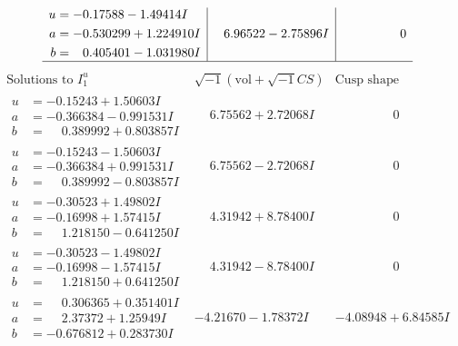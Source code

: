 \documentclass[1p]{elsarticle_modified}
\theoremstyle{definition}
\newcommand{\I}{\sqrt{-1}}
\begin{document}
$$\begin{array}{c|c|c}
\begin{aligned}
u &= -0.17588 - 1.49414 I \\
a &= -0.530299 + 1.224910 I \\
b &= \phantom{-}0.405401 - 1.031980 I\end{aligned}
 & \phantom{-}6.96522 - 2.75896 I & \phantom{-0.000000 } 0\\
 \hline 
 \end{array}$$\newpage$$\begin{array}{c|c|c}  
\text{Solutions to }I^u_{1}& \I (\text{vol} + \sqrt{-1}CS) & \text{Cusp shape}\\
 \hline 
\begin{aligned}
u &= -0.15243 + 1.50603 I \\
a &= -0.366384 - 0.991531 I \\
b &= \phantom{-}0.389992 + 0.803857 I\end{aligned}
 & \phantom{-}6.75562 + 2.72068 I & \phantom{-0.000000 } 0 \\ \hline\begin{aligned}
u &= -0.15243 - 1.50603 I \\
a &= -0.366384 + 0.991531 I \\
b &= \phantom{-}0.389992 - 0.803857 I\end{aligned}
 & \phantom{-}6.75562 - 2.72068 I & \phantom{-0.000000 } 0 \\ \hline\begin{aligned}
u &= -0.30523 + 1.49802 I \\
a &= -0.16998 + 1.57415 I \\
b &= \phantom{-}1.218150 - 0.641250 I\end{aligned}
 & \phantom{-}4.31942 + 8.78400 I & \phantom{-0.000000 } 0 \\ \hline\begin{aligned}
u &= -0.30523 - 1.49802 I \\
a &= -0.16998 - 1.57415 I \\
b &= \phantom{-}1.218150 + 0.641250 I\end{aligned}
 & \phantom{-}4.31942 - 8.78400 I & \phantom{-0.000000 } 0 \\ \hline\begin{aligned}
u &= \phantom{-}0.306365 + 0.351401 I \\
a &= \phantom{-}2.37372 + 1.25949 I \\
b &= -0.676812 + 0.283730 I\end{aligned}
 & -4.21670 - 1.78372 I & -4.08948 + 6.84585 I \\ \hline\begin{aligned}

\end{aligned}
\end{array}$$
\end{document}
